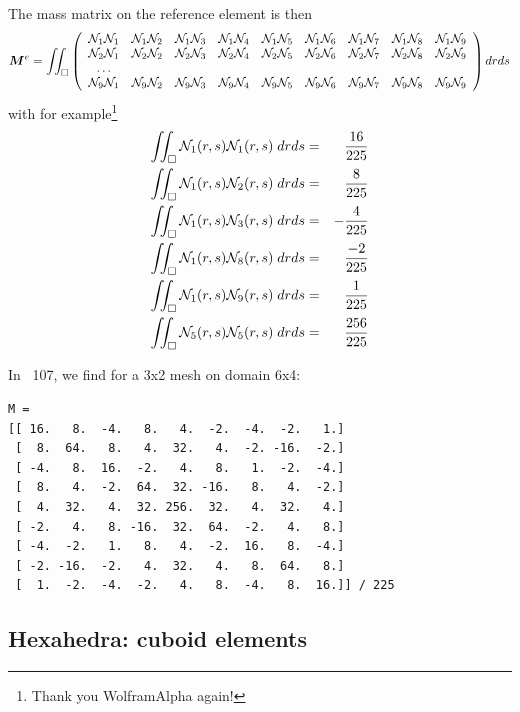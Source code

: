 The mass matrix on the reference element is then
\[
{\bm M}^e =
\iint_\square
\left(
\begin{array}{ccccccccc}
{\mathcal{N}}_1 {\mathcal{N}}_1 & {\mathcal{N}}_1 {\mathcal{N}}_2 & {\mathcal{N}}_1 {\mathcal{N}}_3 & {\mathcal{N}}_1 {\mathcal{N}}_4 & {\mathcal{N}}_1 {\mathcal{N}}_5 & {\mathcal{N}}_1 {\mathcal{N}}_6 & {\mathcal{N}}_1 {\mathcal{N}}_7 & {\mathcal{N}}_1 {\mathcal{N}}_8 & {\mathcal{N}}_1 {\mathcal{N}}_9 \\ 
{\mathcal{N}}_2 {\mathcal{N}}_1 & {\mathcal{N}}_2 {\mathcal{N}}_2 & {\mathcal{N}}_2 {\mathcal{N}}_3 & {\mathcal{N}}_2 {\mathcal{N}}_4 & {\mathcal{N}}_2 {\mathcal{N}}_5 & {\mathcal{N}}_2 {\mathcal{N}}_6 & {\mathcal{N}}_2 {\mathcal{N}}_7 & {\mathcal{N}}_2 {\mathcal{N}}_8 & {\mathcal{N}}_2 {\mathcal{N}}_9 \\ 
\dots \\
{\mathcal{N}}_9 {\mathcal{N}}_1 & {\mathcal{N}}_9 {\mathcal{N}}_2 & {\mathcal{N}}_9 {\mathcal{N}}_3 & {\mathcal{N}}_9 {\mathcal{N}}_4 & {\mathcal{N}}_9 {\mathcal{N}}_5 & {\mathcal{N}}_9 {\mathcal{N}}_6 & {\mathcal{N}}_9 {\mathcal{N}}_7 & {\mathcal{N}}_9 {\mathcal{N}}_8 & {\mathcal{N}}_9 {\mathcal{N}}_9 
\end{array}
\right)
dr ds
\]
with for example\footnote{Thank you WolframAlpha again!}
\begin{eqnarray}
\iint_\square {\mathcal{N}}_1(r,s) {\mathcal{N}}_1(r,s) \; drds &=&  \frac{16}{225} \\
\iint_\square {\mathcal{N}}_1(r,s) {\mathcal{N}}_2(r,s) \; drds &=& \frac{8}{225} \\ 
\iint_\square {\mathcal{N}}_1(r,s) {\mathcal{N}}_3(r,s) \; drds &=&  -\frac{4}{225} \\
\iint_\square {\mathcal{N}}_1(r,s) {\mathcal{N}}_8(r,s) \; drds &=&  \frac{-2}{225} \\
\iint_\square {\mathcal{N}}_1(r,s) {\mathcal{N}}_9(r,s) \; drds &=&  \frac{1}{225} \\
\iint_\square {\mathcal{N}}_5(r,s) {\mathcal{N}}_5(r,s) \; drds &=&  \frac{256}{225} \\
\end{eqnarray}

In \stone~107, we find for a 3x2 mesh on domain 6x4:
\begin{verbatim}
M = 
[[ 16.   8.  -4.   8.   4.  -2.  -4.  -2.   1.]
 [  8.  64.   8.   4.  32.   4.  -2. -16.  -2.]
 [ -4.   8.  16.  -2.   4.   8.   1.  -2.  -4.]
 [  8.   4.  -2.  64.  32. -16.   8.   4.  -2.]
 [  4.  32.   4.  32. 256.  32.   4.  32.   4.]
 [ -2.   4.   8. -16.  32.  64.  -2.   4.   8.]
 [ -4.  -2.   1.   8.   4.  -2.  16.   8.  -4.]
 [ -2. -16.  -2.   4.  32.   4.   8.  64.   8.]
 [  1.  -2.  -4.  -2.   4.   8.  -4.   8.  16.]] / 225
\end{verbatim}







\newpage
\subsection{Hexahedra: cuboid elements}

